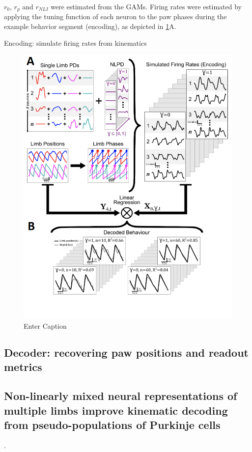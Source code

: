 \(r_{0}\), \(r_{p}\) and \(r_{NLI}\) were estimated from the GAMs. Firing rates were estimated by applying the tuning function of each neuron to the paw phases during the example behavior segment (encoding), as depicted in \ref{fig:encdec}A.

\begin{tcolorbox}
Encoding: simulate firing rates from kinematics
\end{tcolorbox}

\begin{figure}[h!]
    \centering
    \includegraphics[width=.6\linewidth]{Chapters//Figures//chapter3/encoderdecoder.png}
    \caption{Enter Caption}
    \label{fig:encdec}
\end{figure}


\subsection{Decoder: recovering paw positions and readout metrics}



\subsection{Non-linearly mixed neural representations of multiple limbs improve kinematic decoding from pseudo-populations of Purkinje cells}.


